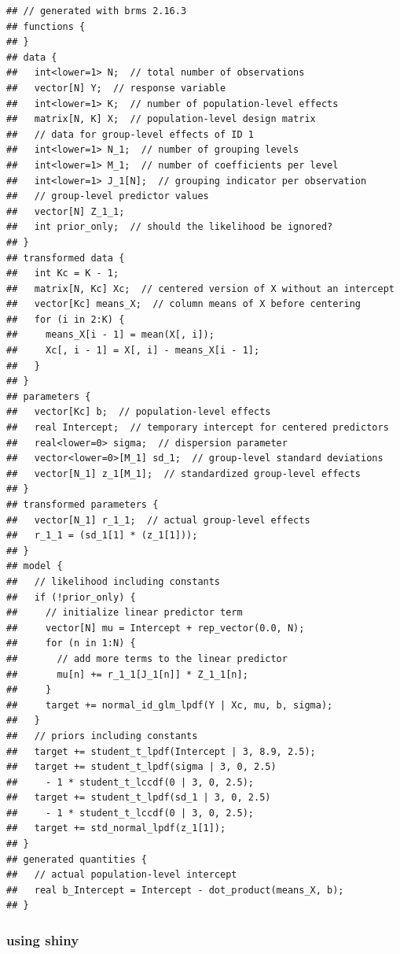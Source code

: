\documentclass[
  12pt,
]{book}
\begin{document}
\begin{verbatim}
## // generated with brms 2.16.3
## functions {
## }
## data {
##   int<lower=1> N;  // total number of observations
##   vector[N] Y;  // response variable
##   int<lower=1> K;  // number of population-level effects
##   matrix[N, K] X;  // population-level design matrix
##   // data for group-level effects of ID 1
##   int<lower=1> N_1;  // number of grouping levels
##   int<lower=1> M_1;  // number of coefficients per level
##   int<lower=1> J_1[N];  // grouping indicator per observation
##   // group-level predictor values
##   vector[N] Z_1_1;
##   int prior_only;  // should the likelihood be ignored?
## }
## transformed data {
##   int Kc = K - 1;
##   matrix[N, Kc] Xc;  // centered version of X without an intercept
##   vector[Kc] means_X;  // column means of X before centering
##   for (i in 2:K) {
##     means_X[i - 1] = mean(X[, i]);
##     Xc[, i - 1] = X[, i] - means_X[i - 1];
##   }
## }
## parameters {
##   vector[Kc] b;  // population-level effects
##   real Intercept;  // temporary intercept for centered predictors
##   real<lower=0> sigma;  // dispersion parameter
##   vector<lower=0>[M_1] sd_1;  // group-level standard deviations
##   vector[N_1] z_1[M_1];  // standardized group-level effects
## }
## transformed parameters {
##   vector[N_1] r_1_1;  // actual group-level effects
##   r_1_1 = (sd_1[1] * (z_1[1]));
## }
## model {
##   // likelihood including constants
##   if (!prior_only) {
##     // initialize linear predictor term
##     vector[N] mu = Intercept + rep_vector(0.0, N);
##     for (n in 1:N) {
##       // add more terms to the linear predictor
##       mu[n] += r_1_1[J_1[n]] * Z_1_1[n];
##     }
##     target += normal_id_glm_lpdf(Y | Xc, mu, b, sigma);
##   }
##   // priors including constants
##   target += student_t_lpdf(Intercept | 3, 8.9, 2.5);
##   target += student_t_lpdf(sigma | 3, 0, 2.5)
##     - 1 * student_t_lccdf(0 | 3, 0, 2.5);
##   target += student_t_lpdf(sd_1 | 3, 0, 2.5)
##     - 1 * student_t_lccdf(0 | 3, 0, 2.5);
##   target += std_normal_lpdf(z_1[1]);
## }
## generated quantities {
##   // actual population-level intercept
##   real b_Intercept = Intercept - dot_product(means_X, b);
## }
\end{verbatim}

\hypertarget{using-shiny}{%
\subsubsection{using shiny}\label{using-shiny}}
\end{document}
